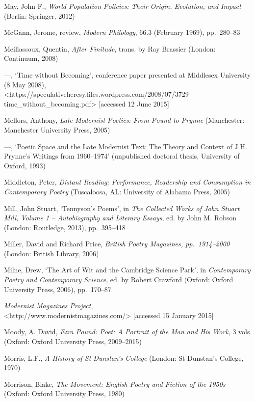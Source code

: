 \documentclass[]{article}
\begin{document}
May, John F., \emph{World Population Policies: Their Origin, Evolution,
and Impact} (Berlin: Springer, 2012)

McGann, Jerome, review, \emph{Modern Philology}, 66.3 (February 1969),
pp.~280--83

Meillassoux, Quentin, \emph{After Finitude}, trans. by Ray Brassier
(London: Continuum, 2008)

---, `Time without Becoming', conference paper presented at Middlesex
University (8 May 2008),\\
\textless{}https://speculativeheresy.files.wordpress.com/2008/07/3729-time\_without\_becoming.pdf\textgreater{}
{[}accessed 12 June 2015{]}

Mellors, Anthony, \emph{Late Modernist Poetics: From Pound to Prynne}
(Manchester: Manchester University Press, 2005)

---, `Poetic Space and the Late Modernist Text: The Theory and Context
of J.H. Prynne's Writings from 1960--1974' (unpublished doctoral thesis,
University of Oxford, 1993)

Middleton, Peter, \emph{Distant Reading: Performance, Readership and
Consumption in Contemporary Poetry} (Tuscaloosa, AL: University of
Alabama Press, 2005)

Mill, John Stuart, `Tennyson's Poems', in \emph{The Collected Works of
John Stuart Mill, Volume 1 -- Autobiography and Literary Essays}, ed. by
John M. Robson (London: Routledge, 2013), pp.~395--418

Miller, David and Richard Price, \emph{British Poetry Magazines,
pp.~1914--2000} (London: British Library, 2006)

Milne, Drew, `The Art of Wit and the Cambridge Science Park', in
\emph{Contemporary Poetry and Contemporary Science}, ed. by Robert
Crawford (Oxford: Oxford University Press, 2006), pp.~170--87

\emph{Modernist Magazines Project},\\
\textless{}http://www.modernistmagazines.com/\textgreater{} {[}accessed
15 January 2015{]}

Moody, A. David, \emph{Ezra Pound: Poet: A Portrait of the Man and His
Work}, 3 vols (Oxford: Oxford University Press, 2009--2015)

Morris, L.F., \emph{A History of St Dunstan's College} (London: St
Dunstan's College, 1970)

Morrison, Blake, \emph{The Movement: English Poetry and Fiction of the
1950s} (Oxford: Oxford University Press, 1980)
\end{document}
